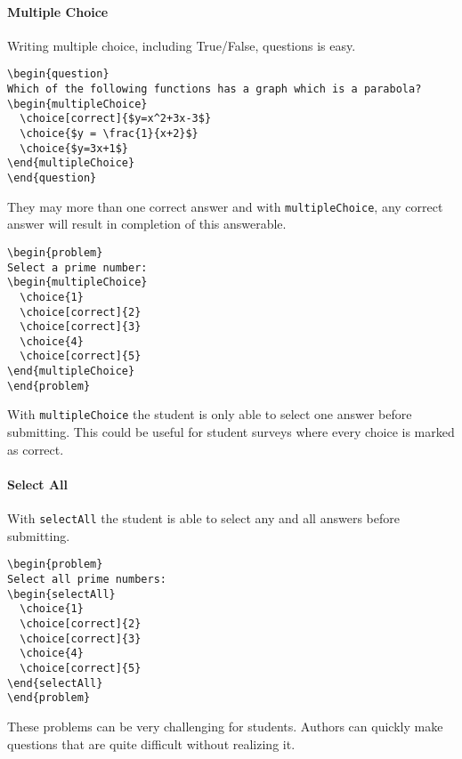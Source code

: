 \documentclass{ximera}
\begin{document}
\paragraph{Multiple Choice}
Writing multiple choice, including True/False, questions is easy.
\begin{verbatim}
\begin{question}
Which of the following functions has a graph which is a parabola?
\begin{multipleChoice}
  \choice[correct]{$y=x^2+3x-3$}
  \choice{$y = \frac{1}{x+2}$}
  \choice{$y=3x+1$}
\end{multipleChoice}
\end{question}
\end{verbatim}
They may more than one correct answer and with \verb!multipleChoice!, any
correct answer will result in completion of this answerable.
\begin{verbatim}
\begin{problem}
Select a prime number:
\begin{multipleChoice}
  \choice{1}
  \choice[correct]{2}
  \choice[correct]{3}
  \choice{4}
  \choice[correct]{5}
\end{multipleChoice}
\end{problem}
\end{verbatim}
With \verb!multipleChoice! the student is only able to select one answer before
submitting. This could be useful for student surveys where every choice is
marked as correct.

\paragraph{Select All}
With \verb!selectAll! the student is able to select any and all answers before
submitting.
\begin{verbatim}
\begin{problem}
Select all prime numbers:
\begin{selectAll}
  \choice{1}
  \choice[correct]{2}
  \choice[correct]{3}
  \choice{4}
  \choice[correct]{5}
\end{selectAll}
\end{problem}
\end{verbatim}
These problems can be very challenging for students. Authors can quickly make
questions that are quite difficult without realizing it.
\end{document}
